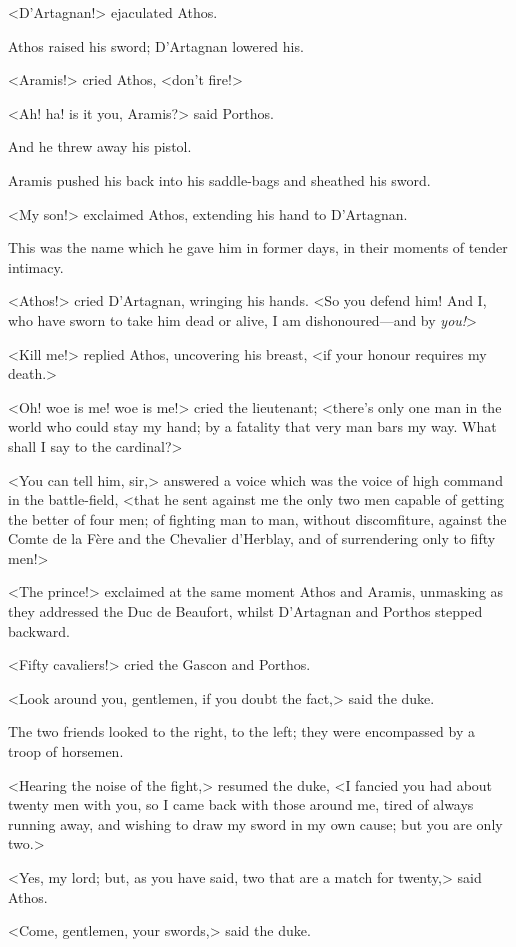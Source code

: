<D'Artagnan!> ejaculated Athos.

Athos raised his sword; D'Artagnan lowered his.

<Aramis!> cried Athos, <don't fire!>

<Ah! ha! is it you, Aramis?> said Porthos.

And he threw away his pistol.

Aramis pushed his back into his saddle-bags and sheathed his sword.

<My son!> exclaimed Athos, extending his hand to D'Artagnan.

This was the name which he gave him in former days, in their moments of tender intimacy.

<Athos!> cried D'Artagnan, wringing his hands. <So you defend him! And I, who have sworn to take him dead or alive, I am dishonoured—and by \emph{you!}>

<Kill me!> replied Athos, uncovering his breast, <if your honour requires my death.>

<Oh! woe is me! woe is me!> cried the lieutenant; <there's only one man in the world who could stay my hand; by a fatality that very man bars my way. What shall I say to the cardinal?>

<You can tell him, sir,> answered a voice which was the voice of high command in the battle-field, <that he sent against me the only two men capable of getting the better of four men; of fighting man to man, without discomfiture, against the Comte de la Fère and the Chevalier d'Herblay, and of surrendering only to fifty men!>

<The prince!> exclaimed at the same moment Athos and Aramis, unmasking as they addressed the Duc de Beaufort, whilst D'Artagnan and Porthos stepped backward.

<Fifty cavaliers!> cried the Gascon and Porthos.

<Look around you, gentlemen, if you doubt the fact,> said the duke.

The two friends looked to the right, to the left; they were encompassed by a troop of horsemen.

<Hearing the noise of the fight,> resumed the duke, <I fancied you had about twenty men with you, so I came back with those around me, tired of always running away, and wishing to draw my sword in my own cause; but you are only two.>

<Yes, my lord; but, as you have said, two that are a match for twenty,> said Athos.

<Come, gentlemen, your swords,> said the duke.

